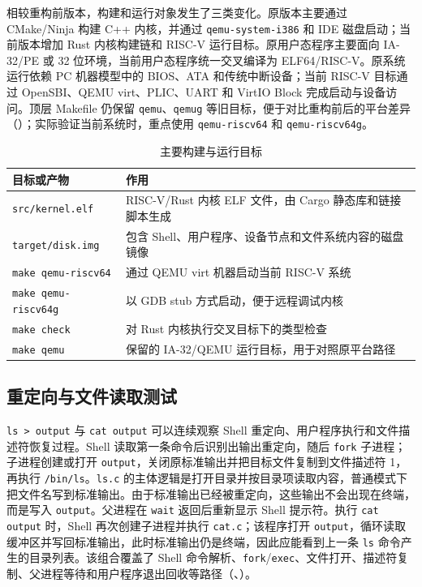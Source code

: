 相较重构前版本，构建和运行对象发生了三类变化。原版本主要通过 CMake/Ninja 构建 C++ 内核，并通过 \verb|qemu-system-i386| 和 IDE 磁盘启动；当前版本增加 Rust 内核构建链和 RISC-V 运行目标。原用户态程序主要面向 IA-32/PE 或 32 位环境，当前用户态程序统一交叉编译为 ELF64/RISC-V。原系统运行依赖 PC 机器模型中的 BIOS、ATA 和传统中断设备；当前 RISC-V 目标通过 OpenSBI、QEMU virt、PLIC、UART 和 VirtIO Block 完成启动与设备访问。顶层 Makefile 仍保留 \verb|qemu|、\verb|qemug| 等旧目标，便于对比重构前后的平台差异（）；实际验证当前系统时，重点使用 \verb|qemu-riscv64| 和 \verb|qemu-riscv64g|。

\begin{table}[htbp]
  \centering
  \caption{主要构建与运行目标}\label{tab:build-targets}
  \renewcommand{\arraystretch}{1.25}
  \begin{tabular}{p{}p{}}
    \toprule
    目标或产物 & 作用 \\
    \midrule
    \verb|src/kernel.elf| & RISC-V/Rust 内核 ELF 文件，由 Cargo 静态库和链接脚本生成 \\
    \verb|target/disk.img| & 包含 Shell、用户程序、设备节点和文件系统内容的磁盘镜像 \\
    \verb|make qemu-riscv64| & 通过 QEMU virt 机器启动当前 RISC-V 系统 \\
    \verb|make qemu-riscv64g| & 以 GDB stub 方式启动，便于远程调试内核 \\
    \verb|make check| & 对 Rust 内核执行交叉目标下的类型检查 \\
    \verb|make qemu| & 保留的 IA-32/QEMU 运行目标，用于对照原平台路径 \\
    \bottomrule
  \end{tabular}
\end{table}

\subsection{重定向与文件读取测试}

\verb|ls > output| 与 \verb|cat output| 可以连续观察 Shell 重定向、用户程序执行和文件描述符恢复过程。Shell 读取第一条命令后识别出输出重定向，随后 \verb|fork| 子进程；子进程创建或打开 \verb|output|，关闭原标准输出并把目标文件复制到文件描述符 1，再执行 \verb|/bin/ls|。\verb|ls.c| 的主体逻辑是打开目录并按目录项读取内容，普通模式下把文件名写到标准输出。由于标准输出已经被重定向，这些输出不会出现在终端，而是写入 \verb|output|。父进程在 \verb|wait| 返回后重新显示 Shell 提示符。执行 \verb|cat output| 时，Shell 再次创建子进程并执行 \verb|cat.c|；该程序打开 \verb|output|，循环读取缓冲区并写回标准输出，此时标准输出仍是终端，因此应能看到上一条 \verb|ls| 命令产生的目录列表。该组合覆盖了 Shell 命令解析、\verb|fork|/\verb|exec|、文件打开、描述符复制、父进程等待和用户程序退出回收等路径（、）。

